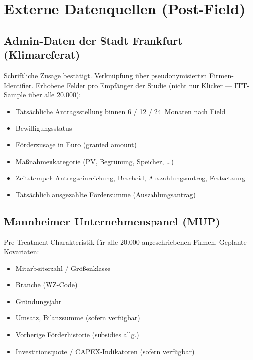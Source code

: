 \documentclass[11pt, a4paper]{scrartcl}
\begin{document}
\section{Externe Datenquellen (Post-Field)}

\subsection{Admin-Daten der Stadt Frankfurt (Klimareferat)}

Schriftliche Zusage bestätigt. Verknüpfung über pseudonymisierten
Firmen-Identifier. Erhobene Felder pro Empfänger der Studie (nicht nur
Klicker --- ITT-Sample über alle 20.000):

\begin{itemize}
    \item Tatsächliche Antragsstellung binnen 6 / 12 / 24~Monaten nach Field
    \item Bewilligungsstatus
    \item Förderzusage in Euro (granted amount)
    \item Maßnahmenkategorie (PV, Begrünung, Speicher, \ldots)
    \item Zeitstempel: Antragseinreichung, Bescheid, Auszahlungsantrag, Festsetzung
    \item Tatsächlich ausgezahlte Fördersumme (Auszahlungsantrag)
\end{itemize}

\subsection{Mannheimer Unternehmenspanel (MUP)}

Pre-Treatment-Charakteristik für alle 20.000 angeschriebenen Firmen.
Geplante Kovariaten:

\begin{itemize}
    \item Mitarbeiterzahl / Größenklasse
    \item Branche (WZ-Code)
    \item Gründungsjahr
    \item Umsatz, Bilanzsumme (sofern verfügbar)
    \item Vorherige Förderhistorie (subsidies allg.)
    \item Investitionsquote / CAPEX-Indikatoren (sofern verfügbar)
\end{itemize}
\end{document}
